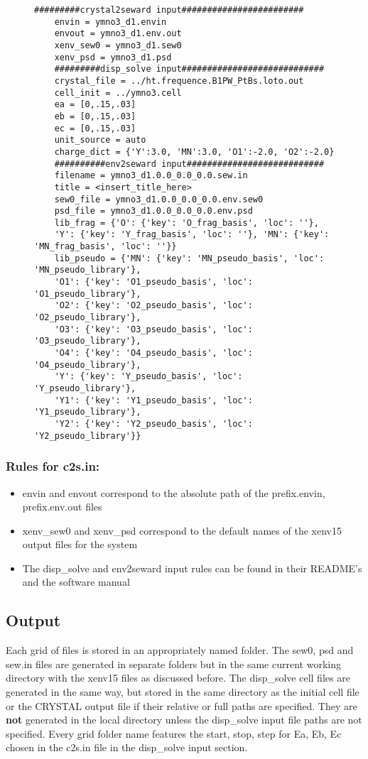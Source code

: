 \begin{figure}
	\centering
	\begin{BVerbatim}[fontsize=\small]
	#########crystal2seward input########################
	envin = ymno3_d1.envin
	envout = ymno3_d1.env.out
	xenv_sew0 = ymno3_d1.sew0
	xenv_psd = ymno3_d1.psd
	#########disp_solve input############################
	crystal_file = ../ht.frequence.B1PW_PtBs.loto.out
	cell_init = ../ymno3.cell
	ea = [0,.15,.03]
	eb = [0,.15,.03]
	ec = [0,.15,.03]
	unit_source = auto
	charge_dict = {'Y':3.0, 'MN':3.0, 'O1':-2.0, 'O2':-2.0}
	##########env2seward input###########################
	filename = ymno3_d1.0.0_0.0_0.0.sew.in
	title = <insert_title_here>
	sew0_file = ymno3_d1.0.0_0.0_0.0.env.sew0
	psd_file = ymno3_d1.0.0_0.0_0.0.env.psd
	lib_frag = {'O': {'key': 'O_frag_basis', 'loc': ''},
	'Y': {'key': 'Y_frag_basis', 'loc': ''}, 'MN': {'key': 'MN_frag_basis', 'loc': ''}}
	lib_pseudo = {'MN': {'key': 'MN_pseudo_basis', 'loc': 'MN_pseudo_library'},
	'O1': {'key': 'O1_pseudo_basis', 'loc': 'O1_pseudo_library'},
	'O2': {'key': 'O2_pseudo_basis', 'loc': 'O2_pseudo_library'},
	'O3': {'key': 'O3_pseudo_basis', 'loc': 'O3_pseudo_library'},
	'O4': {'key': 'O4_pseudo_basis', 'loc': 'O4_pseudo_library'},
	'Y': {'key': 'Y_pseudo_basis', 'loc': 'Y_pseudo_library'},
	'Y1': {'key': 'Y1_pseudo_basis', 'loc': 'Y1_pseudo_library'},
	'Y2': {'key': 'Y2_pseudo_basis', 'loc': 'Y2_pseudo_library'}}
	\end{BVerbatim}
	\caption{}
\end{figure}

\subsubsection{Rules for c2s.in:}

\begin{itemize}
	\item envin and envout correspond to the absolute path of the prefix.envin, prefix.env.out files
	\item xenv\_sew0 and xenv\_psd correspond to the default names of the xenv15 output files for the system
	\item The disp\_solve and env2seward input rules can be found in their README's and the software manual
\end{itemize}

\subsection{Output}

Each grid of files is stored in an appropriately named folder. The sew0, psd and sew.in files are generated in separate folders but in the same current working directory with the xenv15 files as discussed before.
The disp\_solve cell files are generated in the same way, but stored in the same directory as the initial cell file or the CRYSTAL output file if their relative or full paths are specified.
They are \textbf{not} generated in the local directory unless the disp\_solve input file paths are not specified. Every grid folder name features the start, stop, step for Ea, Eb, Ec chosen in the c2s.in file in the disp\_solve input section.